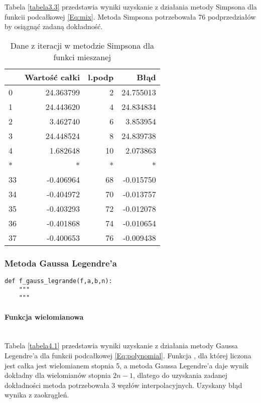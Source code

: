 \documentclass[12pt,twoside]{article}
\begin{document}
Tabela \eqref{tabela3.3} przedstawia wyniki uzyskanie z działania metody Simpsona dla funkcii podcałkowej \eqref{Eq:mix}. Metoda Simpsona potrzebowała 76 podprzedziałów by osiągnąć zadaną dokładność.

\begin{table}[H]
\centering
\caption{Dane z iteracji w metodzie Simpsona dla funkci mieszanej}
\label{tabela3.3}
\begin{tabular}{lrrr}
\toprule
{} &  Wartość całki &  l.podp &       Błąd \\
\midrule
0  &      24.363799 &       2 &  24.755013 \\
1  &      24.443620 &       4 &  24.834834 \\
2  &       3.462740 &       6 &   3.853954 \\
3  &      24.448524 &       8 &  24.839738 \\
4  &       1.682648 &      10 &   2.073863 \\
*   &       * &       * &   * \\
33 &      -0.406964 &      68 &  -0.015750 \\
34 &      -0.404972 &      70 &  -0.013757 \\
35 &      -0.403293 &      72 &  -0.012078 \\
36 &      -0.401868 &      74 &  -0.010654 \\
37 &      -0.400653 &      76 &  -0.009438 \\
\bottomrule
\end{tabular}

\end{table}


\subsubsection{Metoda Gaussa Legendre'a}

\begin{lstlisting}[caption={Kod w języku python implementujący metodę trapezów}]
def f_gauss_legrande(f,a,b,n):
    """
    """
\end{lstlisting}
\label{Listing 9}

\paragraph{Funkcja wielomianowa}\mbox{} \\

Tabela \eqref{tabela4.1} przedstawia wyniki uzyskanie z działania metody Gaussa Legendre'a dla funkcii podcałkowej \eqref{Eq:polynomial}. Funkcja , dla której liczona jest całka jest wielomianem stopnia 5, a metoda Gaussa Legendre'a daje wynik dokładny dla wielomianów stopnia $2n-1$, dlatego do uzyskania zadanej dokładności metoda potrzebowała 3 węzłów interpolacyjnych. Uzyskany błąd wynika z zaokrągleń.
\end{document}
